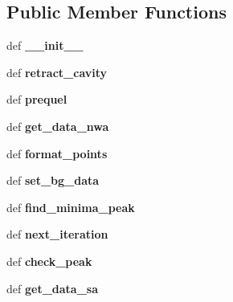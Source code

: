 \subsection*{Public Member Functions}
\begin{DoxyCompactItemize}
\item 
\hypertarget{classmode__tracking_1_1_mode_track_body_ae869a3f9eb7e7e403da7358493d8fb0b}{def {\bfseries \-\_\-\-\_\-init\-\_\-\-\_\-}}\label{classmode__tracking_1_1_mode_track_body_ae869a3f9eb7e7e403da7358493d8fb0b}

\item 
\hypertarget{classmode__tracking_1_1_mode_track_body_a88caab3c24be5410d6503b93a57a6639}{def {\bfseries retract\-\_\-cavity}}\label{classmode__tracking_1_1_mode_track_body_a88caab3c24be5410d6503b93a57a6639}

\item 
\hypertarget{classmode__tracking_1_1_mode_track_body_a03b6d5d5e41558a4a83d18b6b153c23e}{def {\bfseries prequel}}\label{classmode__tracking_1_1_mode_track_body_a03b6d5d5e41558a4a83d18b6b153c23e}

\item 
\hypertarget{classmode__tracking_1_1_mode_track_body_aff9a6636f652e5f1447e7baaff664d2b}{def {\bfseries get\-\_\-data\-\_\-nwa}}\label{classmode__tracking_1_1_mode_track_body_aff9a6636f652e5f1447e7baaff664d2b}

\item 
\hypertarget{classmode__tracking_1_1_mode_track_body_a6217026364bdee7bdb38539df136d3e1}{def {\bfseries format\-\_\-points}}\label{classmode__tracking_1_1_mode_track_body_a6217026364bdee7bdb38539df136d3e1}

\item 
\hypertarget{classmode__tracking_1_1_mode_track_body_a134ec4feac3baa6fdba401314bf36569}{def {\bfseries set\-\_\-bg\-\_\-data}}\label{classmode__tracking_1_1_mode_track_body_a134ec4feac3baa6fdba401314bf36569}

\item 
\hypertarget{classmode__tracking_1_1_mode_track_body_a1ba98cc4cf92d7f6f528442da4c9bf27}{def {\bfseries find\-\_\-minima\-\_\-peak}}\label{classmode__tracking_1_1_mode_track_body_a1ba98cc4cf92d7f6f528442da4c9bf27}

\item 
\hypertarget{classmode__tracking_1_1_mode_track_body_af2c12b1611a734a5abda3b3dec54d694}{def {\bfseries next\-\_\-iteration}}\label{classmode__tracking_1_1_mode_track_body_af2c12b1611a734a5abda3b3dec54d694}

\item 
\hypertarget{classmode__tracking_1_1_mode_track_body_a7f7af78078cc7f2d44983efd5485fb1c}{def {\bfseries check\-\_\-peak}}\label{classmode__tracking_1_1_mode_track_body_a7f7af78078cc7f2d44983efd5485fb1c}

\item 
\hypertarget{classmode__tracking_1_1_mode_track_body_a65025f54e5404de32eef4947fcf94117}{def {\bfseries get\-\_\-data\-\_\-sa}}\label{classmode__tracking_1_1_mode_track_body_a65025f54e5404de32eef4947fcf94117}

\end{DoxyCompactItemize}
